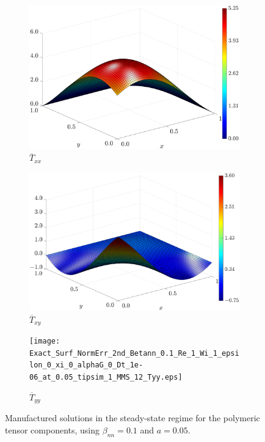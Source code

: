 \documentclass[preprint, 12pt]{elsarticle}
\begin{document}
\begin{figure}
    \begin{subfigure}[b]{.46\textwidth}
        \includegraphics[width=\textwidth]{Exact_Surf_NormErr_2nd_Betann_0.1_Re_1_Wi_1_epsilon_0_xi_0_alphaG_0_Dt_1e-06_at_0.05_tipsim_1_MMS_12_Txx.eps}
        \caption{$\overline{T}_{xx}$}
        \label{fig:solexaTxxCase1}
    \end{subfigure}
    \vspace{0.2cm}
    \begin{subfigure}[b]{.46\textwidth}
        \includegraphics[width=\textwidth]{Exact_Surf_NormErr_2nd_Betann_0.1_Re_1_Wi_1_epsilon_0_xi_0_alphaG_0_Dt_1e-06_at_0.05_tipsim_1_MMS_12_Txy.eps}
        \caption{$\overline{T}_{xy}$}
        \label{fig:solexaTxyCase1}
    \end{subfigure}
    \begin{subfigure}[b]{.46\textwidth}
        \texttt{[image: Exact\_Surf\_NormErr\_2nd\_Betann\_0.1\_Re\_1\_Wi\_1\_epsilon\_0\_xi\_0\_alphaG\_0\_Dt\_1e-06\_at\_0.05\_tipsim\_1\_MMS\_12\_Tyy.eps]}
        \caption{$\overline{T}_{yy}$}
        \label{fig:solexaTyyCase1}
    \end{subfigure}
    \vspace{0.02cm}
    \caption{Manufactured solutions in the steady-state regime for the polymeric tensor components, using $\beta_{nn}=0.1$ and $a = 0.05$.\label{T_m_u_sol_num_case1map2}}
\end{figure}
\end{document}
